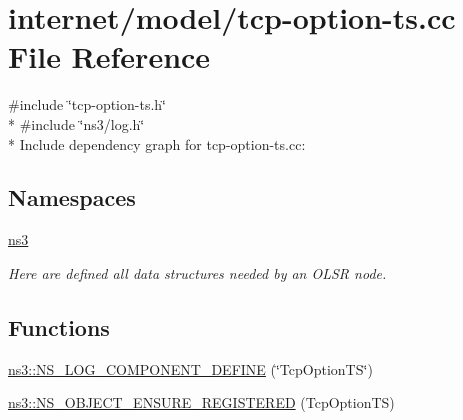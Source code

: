 \hypertarget{tcp-option-ts_8cc}{}\section{internet/model/tcp-\/option-\/ts.cc File Reference}
\label{tcp-option-ts_8cc}
{\ttfamily \#include \char`\"{}tcp-\/option-\/ts.\+h\char`\"{}}\\*
{\ttfamily \#include \char`\"{}ns3/log.\+h\char`\"{}}\\*
Include dependency graph for tcp-\/option-\/ts.cc\+:
\subsection*{Namespaces}
\begin{DoxyCompactItemize}
\item 
 \hyperlink{namespacens3}{ns3}
\begin{DoxyCompactList}\small\item\em Here are defined all data structures needed by an O\+L\+SR node. \end{DoxyCompactList}\end{DoxyCompactItemize}
\subsection*{Functions}
\begin{DoxyCompactItemize}
\item 
\hyperlink{namespacens3_ab075ea959802e1f64601021324c06b0d}{ns3\+::\+N\+S\+\_\+\+L\+O\+G\+\_\+\+C\+O\+M\+P\+O\+N\+E\+N\+T\+\_\+\+D\+E\+F\+I\+NE} (\char`\"{}Tcp\+Option\+TS\char`\"{})
\item 
\hyperlink{namespacens3_a7134affa6d126b4e6ab1b3d9e6420172}{ns3\+::\+N\+S\+\_\+\+O\+B\+J\+E\+C\+T\+\_\+\+E\+N\+S\+U\+R\+E\+\_\+\+R\+E\+G\+I\+S\+T\+E\+R\+ED} (Tcp\+Option\+TS)
\end{DoxyCompactItemize}
